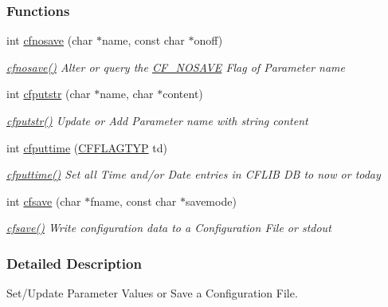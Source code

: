 \subsubsection*{Functions}
\begin{DoxyCompactItemize}
\item 
int \hyperlink{group__setting__saving_ga0f6ed90e3ecfa0074af1635a0e4339ef}{cfnosave} (char $\ast$name, const char $\ast$onoff)
\begin{DoxyCompactList}\small\item\em \hyperlink{group__setting__saving_ga0f6ed90e3ecfa0074af1635a0e4339ef}{cfnosave()} Alter or query the \hyperlink{group__special__options__mask_gad76153c65f68cc0ee5c1a04c8c3e80bf}{C\-F\-\_\-\-N\-O\-S\-A\-V\-E} Flag of Parameter {\itshape name\/} \end{DoxyCompactList}\item 
int \hyperlink{group__setting__saving_ga9553f7a24b080660793a560c2bc8f210}{cfputstr} (char $\ast$name, char $\ast$content)
\begin{DoxyCompactList}\small\item\em \hyperlink{group__setting__saving_ga9553f7a24b080660793a560c2bc8f210}{cfputstr()} Update or Add Parameter {\itshape name\/} with string {\itshape content\/} \end{DoxyCompactList}\item 
int \hyperlink{group__setting__saving_ga6f133f88dc253a6a80d13eed4d123063}{cfputtime} (\hyperlink{group__special__options__mask_ga4854f1596d5c6e0604a478fa9a2e23f0}{C\-F\-F\-L\-A\-G\-T\-Y\-P} td)
\begin{DoxyCompactList}\small\item\em \hyperlink{group__setting__saving_ga6f133f88dc253a6a80d13eed4d123063}{cfputtime()} Set all Time and/or Date entries in C\-F\-L\-I\-B D\-B to {\itshape now\/} or {\itshape today\/} \end{DoxyCompactList}\item 
int \hyperlink{group__setting__saving_gaad7e1267cd904b4480a0eeaeb03b5f75}{cfsave} (char $\ast$fname, const char $\ast$savemode)
\begin{DoxyCompactList}\small\item\em \hyperlink{group__setting__saving_gaad7e1267cd904b4480a0eeaeb03b5f75}{cfsave()} Write configuration data to a Configuration File or {\ttfamily stdout} \end{DoxyCompactList}\end{DoxyCompactItemize}


\subsubsection{Detailed Description}
Set/\-Update Parameter Values or Save a Configuration File. 

